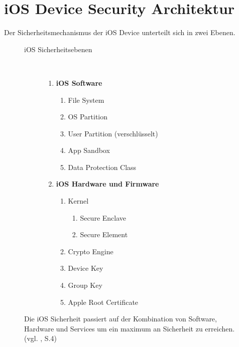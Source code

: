 \pagebreak
\section{iOS Device Security Architektur}
\label{sec:iOSSecArchitektur}

Der Sicherheitsmechanismus der iOS Device unterteilt sich in zwei Ebenen. 
\begin{figure}[htb]
  \begin{minipage}{0.6\textwidth} 
  		\begin{description}
   			\item[ iOS Sicherheitsebenen]~\par
         		\begin{enumerate}	
				\item  \textbf{iOS Software}
					\begin{enumerate}
       						\item File System
         					\item OS Partition
						\item User Partition (verschlüsselt)
						\item App Sandbox
						\item Data Protection Class
      					\end{enumerate}
      				\item  \textbf{iOS Hardware und Firmware}~\par
					\begin{enumerate}
       						\item Kernel
						\begin{enumerate}
						\item Secure Enclave
						\item Secure Element
         					\end{enumerate}	
						\item Crypto Engine
						\item Device Key
						\item Group Key
						\item Apple Root Certificate
      					\end{enumerate}
			\end{enumerate}
   		\end{description}
Die iOS Sicherheit passiert auf der Kombination von Software, Hardware und
Services um ein maximum an Sicherheit zu erreichen. (vgl. \cite{Apple[4]}, S.4)
	\end{minipage}
	\hfil
	\begin{minipage}{0.4\textwidth}

\end{minipage}
\end{figure}
